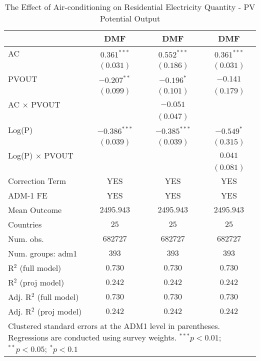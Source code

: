 
\begin{table}[htbp]
\caption{The Effect of Air-conditioning on Residential Electricity Quantity - PV Potential Output}
\begin{center}
\begin{tabular}{l c c c}
\hline
 & DMF & DMF & DMF \\
\hline
AC                      & $0.361^{***}$  & $0.552^{***}$  & $0.361^{***}$ \\
                        & $(0.031)$      & $(0.186)$      & $(0.031)$     \\
PVOUT                   & $-0.207^{**}$  & $-0.196^{*}$   & $-0.141$      \\
                        & $(0.099)$      & $(0.101)$      & $(0.179)$     \\
AC $\times$ PVOUT       &                & $-0.051$       &               \\
                        &                & $(0.047)$      &               \\
Log(P)                  & $-0.386^{***}$ & $-0.385^{***}$ & $-0.549^{*}$  \\
                        & $(0.039)$      & $(0.039)$      & $(0.315)$     \\
Log(P) $\times$ PVOUT   &                &                & $0.041$       \\
                        &                &                & $(0.081)$     \\
\hline
Correction Term         & YES            & YES            & YES           \\
ADM-1 FE                & YES            & YES            & YES           \\
Mean Outcome            & $2495.943$     & $2495.943$     & $2495.943$    \\
Countries               & $25$           & $25$           & $25$          \\
Num. obs.               & $682727$       & $682727$       & $682727$      \\
Num. groups: adm1       & $393$          & $393$          & $393$         \\
R$^2$ (full model)      & $0.730$        & $0.730$        & $0.730$       \\
R$^2$ (proj model)      & $0.242$        & $0.242$        & $0.242$       \\
Adj. R$^2$ (full model) & $0.730$        & $0.730$        & $0.730$       \\
Adj. R$^2$ (proj model) & $0.242$        & $0.242$        & $0.242$       \\
\hline
\multicolumn{4}{l}{\scriptsize{Clustered standard errors at the ADM1 level in parentheses. Regressions are conducted using survey weights. $^{***}p<0.01$; $^{**}p<0.05$; $^{*}p<0.1$}}
\end{tabular}
\label{main: tableA6}
\end{center}
\end{table}
